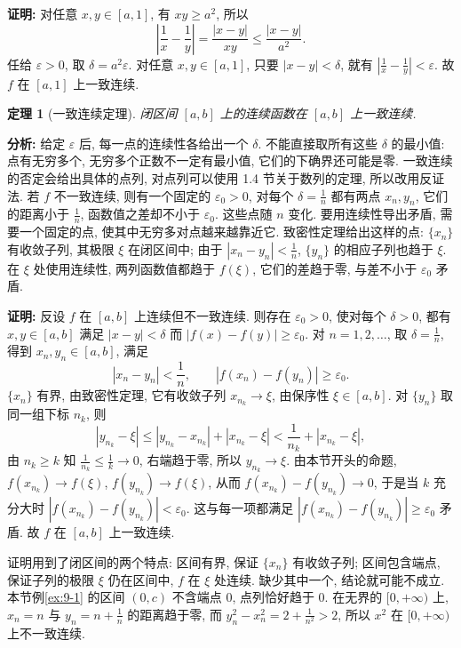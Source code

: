 \documentclass[UTF8,openany]{ctexbook}
\theoremstyle{chinesetextbook}
\newtheorem{theorem}{定理}[section]
\newenvironment{cnproof}{\par\indent\textbf{证明:} \ignorespaces}{\par}
\begin{document}
\begin{cnproof}
对任意 $x,y\in[a,1]$, 有 $xy\ge a^2$, 所以
\[
\left|\frac1x-\frac1y\right|=\frac{|x-y|}{xy}\le\frac{|x-y|}{a^2}.
\]
任给 $\varepsilon>0$, 取 $\delta=a^2\varepsilon$. 对任意 $x,y\in[a,1]$, 只要 $|x-y|<\delta$, 就有 $\displaystyle\left|\frac1x-\frac1y\right|<\varepsilon$. 故 $f$ 在 $[a,1]$ 上一致连续.
\end{cnproof}
\begin{theorem}[一致连续定理]
闭区间 $[a,b]$ 上的连续函数在 $[a,b]$ 上一致连续.
\end{theorem}
\par\indent\textbf{分析:} 给定 $\varepsilon$ 后, 每一点的连续性各给出一个 $\delta$. 不能直接取所有这些 $\delta$ 的最小值: 点有无穷多个, 无穷多个正数不一定有最小值, 它们的下确界还可能是零. 一致连续的否定会给出具体的点列, 对点列可以使用 1.4 节关于数列的定理, 所以改用反证法. 若 $f$ 不一致连续, 则有一个固定的 $\varepsilon_0>0$, 对每个 $\displaystyle\delta=\frac1n$ 都有两点 $x_n,y_n$, 它们的距离小于 $\displaystyle\frac1n$, 函数值之差却不小于 $\varepsilon_0$. 这些点随 $n$ 变化. 要用连续性导出矛盾, 需要一个固定的点, 使其中无穷多对点越来越靠近它. 致密性定理给出这样的点: $\{x_n\}$ 有收敛子列, 其极限 $\xi$ 在闭区间中; 由于 $\displaystyle|x_n-y_n|<\frac1n$, $\{y_n\}$ 的相应子列也趋于 $\xi$. 在 $\xi$ 处使用连续性, 两列函数值都趋于 $f(\xi)$, 它们的差趋于零, 与差不小于 $\varepsilon_0$ 矛盾.
\begin{cnproof}
反设 $f$ 在 $[a,b]$ 上连续但不一致连续. 则存在 $\varepsilon_0>0$, 使对每个 $\delta>0$, 都有 $x,y\in[a,b]$ 满足 $|x-y|<\delta$ 而 $|f(x)-f(y)|\ge\varepsilon_0$. 对 $n=1,2,\ldots$, 取 $\displaystyle\delta=\frac1n$, 得到 $x_n,y_n\in[a,b]$, 满足
\[
|x_n-y_n|<\frac1n,\qquad|f(x_n)-f(y_n)|\ge\varepsilon_0.
\]
$\{x_n\}$ 有界, 由致密性定理, 它有收敛子列 $x_{n_k}\to\xi$, 由保序性 $\xi\in[a,b]$. 对 $\{y_n\}$ 取同一组下标 $n_k$, 则
\[
|y_{n_k}-\xi|\le|y_{n_k}-x_{n_k}|+|x_{n_k}-\xi|<\frac1{n_k}+|x_{n_k}-\xi|,
\]
由 $n_k\ge k$ 知 $\displaystyle\frac1{n_k}\le\frac1k\to0$, 右端趋于零, 所以 $y_{n_k}\to\xi$. 由本节开头的命题, $f(x_{n_k})\to f(\xi)$, $f(y_{n_k})\to f(\xi)$, 从而 $f(x_{n_k})-f(y_{n_k})\to0$, 于是当 $k$ 充分大时 $|f(x_{n_k})-f(y_{n_k})|<\varepsilon_0$. 这与每一项都满足 $|f(x_{n_k})-f(y_{n_k})|\ge\varepsilon_0$ 矛盾. 故 $f$ 在 $[a,b]$ 上一致连续.
\end{cnproof}
证明用到了闭区间的两个特点: 区间有界, 保证 $\{x_n\}$ 有收敛子列; 区间包含端点, 保证子列的极限 $\xi$ 仍在区间中, $f$ 在 $\xi$ 处连续. 缺少其中一个, 结论就可能不成立. 本节例\ref{ex:9-1} 的区间 $(0,c)$ 不含端点 $0$, 点列恰好趋于 $0$. 在无界的 $[0,+\infty)$ 上, $x_n=n$ 与 $\displaystyle y_n=n+\frac1n$ 的距离趋于零, 而 $\displaystyle y_n^2-x_n^2=2+\frac1{n^2}>2$, 所以 $x^2$ 在 $[0,+\infty)$ 上不一致连续.
\end{document}
